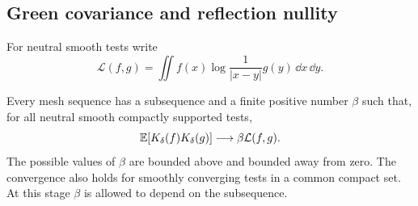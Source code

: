 \subsection{Green covariance and reflection nullity}

For neutral smooth tests write
\[
 \mathcal L(f,g)=\iint f(x)\log\frac1{|x-y|}g(y)\,\dd x\,\dd y.
\]

\begin{proposition}
\label{prop:plane-green}
Every mesh sequence has a subsequence and a finite positive number $\beta$
such that, for all neutral smooth compactly supported tests,
\begin{equation}
 \mathbb E[K_\delta(f)K_\delta(g)]\longrightarrow\beta\mathcal L(f,g).
 \label{eq:plane-green}
\end{equation}
The possible values of $\beta$ are bounded above and bounded away from zero.
The convergence also holds for smoothly converging tests in a common compact
set. At this stage $\beta$ is allowed to depend on the subsequence.
\end{proposition}

